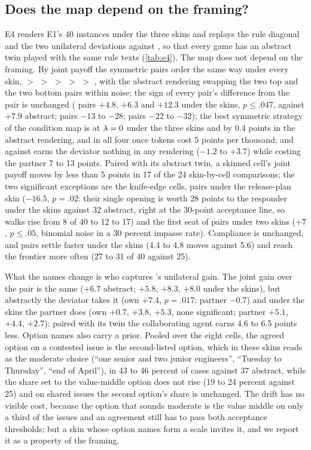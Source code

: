 \subsection{Does the map depend on the framing?}
\label{sec:e4}
E4 renders E1's 40 instances under the three skins and replays the rule diagonal and the two unilateral deviations against \neutral, so that every game has an abstract twin played with the same rule texts (\cref{tab:e4}). The map does not depend on the framing. By joint payoff the symmetric pairs order the same way under every skin, \collaborating{} $>$ \accommodating{} $>$ \neutral{} $>$ \compromising{} $>$ \competing{} $>$ \avoiding, with the abstract rendering swapping the two top and the two bottom pairs within noise; the sign of every pair's difference from the \neutral{} pair is unchanged (\collaborating{} pairs $+4.8$, $+6.3$ and $+12.3$ under the skins, $p \le .047$, against $+7.9$ abstract; \competing{} pairs $-13$ to $-28$; \avoiding{} pairs $-22$ to $-32$); the best symmetric strategy of the condition map is \collaborating{} at $\lambda=0$ under the three skins and \accommodating{} by 0.4 points in the abstract rendering, and \accommodating{} in all four once tokens cost 5 points per thousand; and \competing{} against \neutral{} earns the deviator nothing in any rendering ($-1.2$ to $+3.7$) while costing the partner 7 to 13 points. Paired with its abstract twin, a skinned cell's joint payoff moves by less than 5 points in 17 of the 24 skin-by-cell comparisons; the two significant exceptions are the knife-edge cells, \avoiding{} pairs under the release-plan skin ($-16.5$, $p = .02$: their single opening is worth 28 points to the responder under the skins against 32 abstract, right at the 30-point acceptance line, so walks rise from 8 of 40 to 12 to 17) and the first seat of \competing{} pairs under two skins ($+7$, $p \le .05$, binomial noise in a 30 percent impasse rate). Compliance is unchanged, and \collaborating{} pairs settle faster under the skins (4.4 to 4.8 moves against 5.6) and reach the frontier more often (27 to 31 of 40 against 25).

What the names change is who captures \collaborating's unilateral gain. The joint gain over the \neutral{} pair is the same ($+6.7$ abstract; $+5.8$, $+8.3$, $+8.0$ under the skins), but abstractly the deviator takes it (own $+7.4$, $p = .017$; partner $-0.7$) and under the skins the partner does (own $+0.7$, $+3.8$, $+5.3$, none significant; partner $+5.1$, $+4.4$, $+2.7$): paired with its twin the collaborating agent earns 4.6 to 6.5 points less. Option names also carry a prior. Pooled over the eight cells, the agreed option on a contested issue is the second-listed option, which in these skins reads as the moderate choice (``one senior and two junior engineers'', ``Tuesday to Thursday'', ``end of April''), in 43 to 46 percent of cases against 37 abstract, while the share set to the value-middle option does not rise (19 to 24 percent against 25) and on shared issues the second option's share is unchanged. The drift has no visible cost, because the option that sounds moderate is the value middle on only a third of the issues and an agreement still has to pass both acceptance thresholds; but a skin whose option names form a scale invites it, and we report it as a property of the framing.

